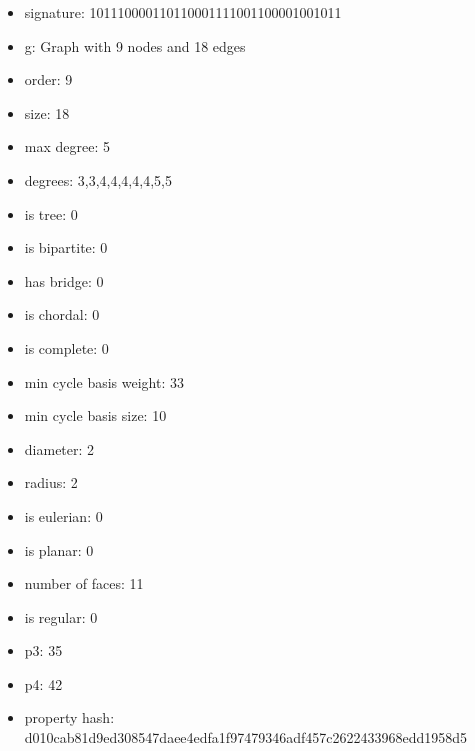 \newpage
\begin{figure}
\end{figure}
\begin{itemize}
\item signature: 101110000110110001111001100001001011
\item g: Graph with 9 nodes and 18 edges
\item order: 9
\item size: 18
\item max degree: 5
\item degrees: 3,3,4,4,4,4,4,5,5
\item is tree: 0
\item is bipartite: 0
\item has bridge: 0
\item is chordal: 0
\item is complete: 0
\item min cycle basis weight: 33
\item min cycle basis size: 10
\item diameter: 2
\item radius: 2
\item is eulerian: 0
\item is planar: 0
\item number of faces: 11
\item is regular: 0
\item p3: 35
\item p4: 42
\item property hash: d010cab81d9ed308547daee4edfa1f97479346adf457c2622433968edd1958d5
\end{itemize}
